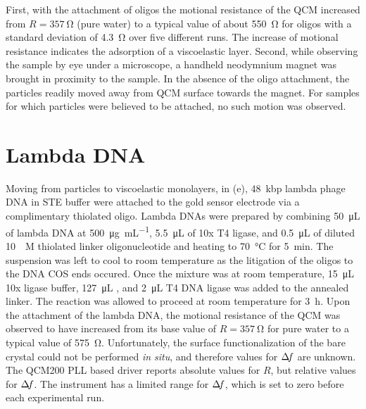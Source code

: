 First, with the attachment of oligos the motional resistance of the QCM
increased from $R=\SI{357}{\ohm}$ (pure water) to a typical value of about
\SI{550}{\ohm} for oligos with a standard deviation of \SI{4.3}{\ohm} over
five different runs.  The increase of motional resistance indicates the
adsorption of a viscoelastic layer.  Second, while observing the sample by
eye under a microscope, a handheld neodymnium magnet was brought in
proximity to the sample.  In the absence of the oligo attachment, the
particles readily moved away from QCM surface towards the magnet.  For
samples for which particles were believed to be attached, no such motion
was observed.  


\section{Lambda DNA}
Moving from particles to viscoelastic monolayers, in
(e), \SI{48}{kbp} lambda phage DNA in STE buffer were
attached to the gold sensor electrode via a complimentary thiolated oligo.  
Lambda DNAs were prepared by combining \SI{50}{\micro\liter} of lambda DNA
at \SI{500}{\micro\gram\per\milli\liter}, \SI{5.5}{\micro\liter} of 10x T4
ligase, and \SI{0.5}{\micro\liter} of diluted \SI{10}{\micro\textsc{M}}
thiolated linker oligonucleotide and heating to \SI{70}{\celsius} for
\SI{5}{\minute}.  The suspension was left to cool to room temperature as
the litigation of the oligos to the DNA COS ends occured. Once the mixture
was at room temperature, \SI{15}{\micro\liter} 10x ligase buffer,
\SI{127}{\micro\liter} , and \SI{2}{\micro\liter} T4 DNA ligase was
added to the annealed linker.  The reaction was allowed to proceed at room
temperature for \SI{3}{\hour}.  Upon the attachment of the lambda DNA, the
motional resistance of the QCM was observed to have increased from its base
value of $R=\SI{357}{\ohm}$ for pure water to a typical value of
\SI{575}{\ohm}.  Unfortunately, the surface functionalization of the bare
crystal could not be performed \textit{in situ}, and therefore values for
$\Delta\!f$ are unknown.  The QCM200 PLL based driver reports absolute values for
$R$, but relative values for $\Delta\!f$.  The instrument has a limited range for
$\Delta\!f$, which is set to zero before each experimental run.

